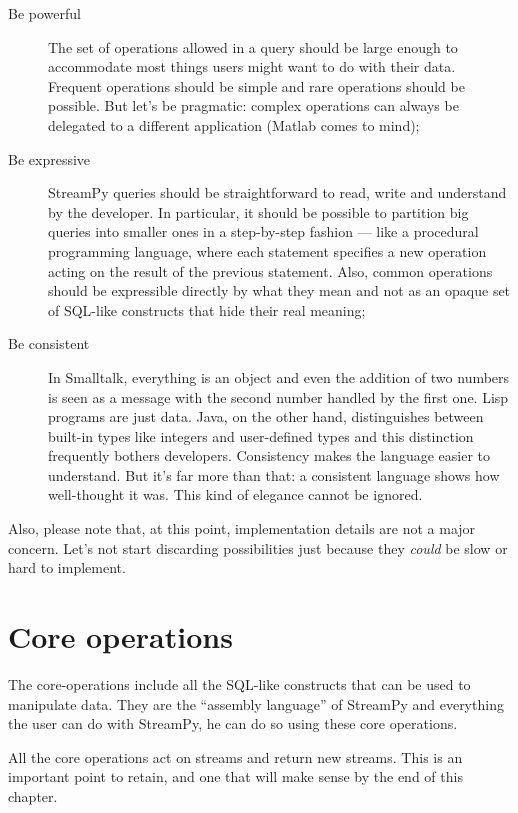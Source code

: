 \documentclass[twoside]{report}
\begin{document}
\begin{description}
\item[Be powerful] The set of operations allowed in a query should be large enough to accommodate most things users might want to do with their data. Frequent operations should be simple and rare operations should be possible. But let's be pragmatic: complex operations can always be delegated to a different application (Matlab comes to mind);
\item[Be expressive] StreamPy queries should be straightforward to read, write and understand by the developer. In particular, it should be possible to partition big queries into smaller ones in a step-by-step fashion --- like a procedural programming language, where each statement specifies a new operation acting on the result of the previous statement. Also, common operations should be expressible directly by what they mean and not as an opaque set of SQL-like constructs that hide their real meaning;
\item[Be consistent] In Smalltalk, everything is an object and even the addition of two numbers is seen as a message with the second number handled by the first one. Lisp programs are just data. Java, on the other hand, distinguishes between built-in types like integers and user-defined types and this distinction frequently bothers developers. Consistency makes the language easier to understand. But it's far more than that: a consistent language shows how well-thought it was. This kind of elegance cannot be ignored.
\end{description}

Also, please note that, at this point, implementation details are not a major concern. Let's not start discarding possibilities just because they \emph{could} be slow or hard to implement.

\chapter{Core operations}
The core-operations include all the SQL-like constructs that can be used to manipulate data. They are the ``assembly language'' of StreamPy and everything the user can do with StreamPy, he can do so using these core operations.

All the core operations act on streams and return new streams. This is an important point to retain, and one that will make sense by the end of this chapter.
\end{document}
